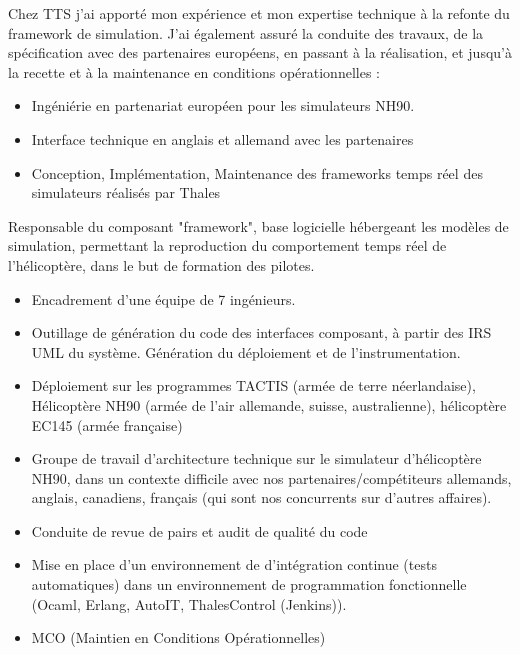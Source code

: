 \myvspace

Chez TTS j'ai apporté mon expérience et mon expertise technique à la refonte du framework de simulation. J'ai également assuré la conduite des travaux, de la spécification avec des partenaires européens, en passant à la réalisation, et jusqu'à la recette et à la maintenance en conditions opérationnelles :
\begin{itemize}
\item {Ingéniérie en partenariat européen pour les simulateurs NH90.}
\item {Interface technique en anglais et allemand avec les partenaires}
\item {Conception, Implémentation, Maintenance des frameworks temps réel des simulateurs réalisés par Thales}
\end{itemize}
\pagebreak
\myvspace
Responsable du composant "framework", base logicielle hébergeant les modèles de simulation, permettant la reproduction du comportement temps réel de l'hélicoptère, dans le but de formation des pilotes.
\begin{itemize}
\item{	Encadrement d’une équipe de 7 ingénieurs.}
\item{	Outillage de génération du code des interfaces composant, à partir des IRS UML du système. Génération du déploiement et de l’instrumentation.}
\item{Déploiement sur les programmes TACTIS (armée de terre néerlandaise), Hélicoptère NH90 (armée de l’air allemande, suisse, australienne), hélicoptère EC145 (armée française)}
\item{Groupe de travail d’architecture technique sur le simulateur d’hélicoptère NH90, dans un contexte difficile avec nos partenaires/compétiteurs allemands, anglais, canadiens, français (qui sont nos concurrents sur d’autres affaires).}
\item {Conduite de revue de pairs et audit de qualité du code}
\item {Mise en place d’un environnement de d’intégration continue (tests automatiques) dans un environnement de programmation fonctionnelle (Ocaml, Erlang, AutoIT, ThalesControl (Jenkins)).}
\item {MCO (Maintien en Conditions Opérationnelles)}
\end{itemize}